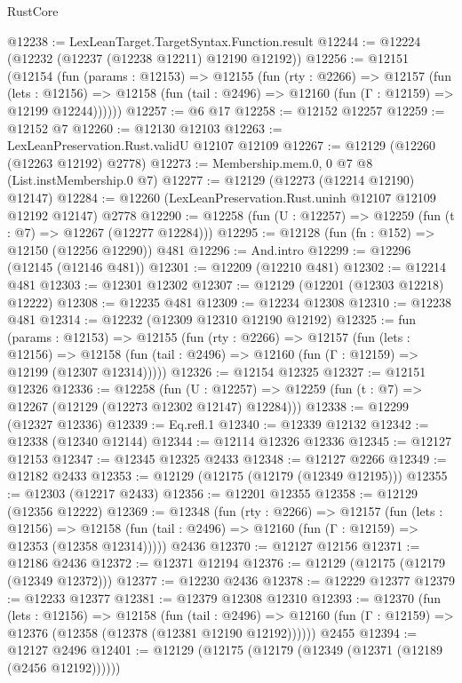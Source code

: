 \begin{lexlean}{RustCore}
\begin{coremodule}
@12238 := LexLeanTarget.TargetSyntax.Function.result
@12244 := @12224 (@12232 (@12237 (@12238 @12211) @12190 @12192))
@12256 := @12151
    (@12154
      (fun (params : @12153) =>
      @12155
        (fun (rty : @2266) =>
        @12157
          (fun (lets : @12156) =>
          @12158 (fun (tail : @2496) => @12160 (fun (Γ : @12159) => @12199 @12244))))))
@12257 := @6 @17
@12258 := @12152 @12257
@12259 := @12152 @7
@12260 := @12130 @12103
@12263 := LexLeanPreservation.Rust.validU @12107 @12109
@12267 := @12129 (@12260 (@12263 @12192) @2778)
@12273 := Membership.mem.{0, 0} @7 @8 (List.instMembership.{0} @7)
@12277 := @12129 (@12273 (@12214 @12190) @12147)
@12284 := @12260 (LexLeanPreservation.Rust.uninh @12107 @12109 @12192 @12147) @2778
@12290 := @12258 (fun (U : @12257) => @12259 (fun (t : @7) => @12267 (@12277 @12284)))
@12295 := @12128 (fun (fn : @152) => @12150 (@12256 @12290)) @481
@12296 := And.intro
@12299 := @12296 (@12145 (@12146 @481))
@12301 := @12209 (@12210 @481)
@12302 := @12214 @481
@12303 := @12301 @12302
@12307 := @12129 (@12201 (@12303 @12218) @12222)
@12308 := @12235 @481
@12309 := @12234 @12308
@12310 := @12238 @481
@12314 := @12232 (@12309 @12310 @12190 @12192)
@12325 := fun (params : @12153) =>
  @12155
    (fun (rty : @2266) =>
    @12157
      (fun (lets : @12156) =>
      @12158 (fun (tail : @2496) => @12160 (fun (Γ : @12159) => @12199 (@12307 @12314)))))
@12326 := @12154 @12325
@12327 := @12151 @12326
@12336 := @12258
    (fun (U : @12257) => @12259 (fun (t : @7) => @12267 (@12129 (@12273 @12302 @12147) @12284)))
@12338 := @12299 (@12327 @12336)
@12339 := Eq.refl.{1}
@12340 := @12339 @12132
@12342 := @12338 (@12340 @12144)
@12344 := @12114 @12326 @12336
@12345 := @12127 @12153
@12347 := @12345 @12325 @2433
@12348 := @12127 @2266
@12349 := @12182 @2433
@12353 := @12129 (@12175 (@12179 (@12349 @12195)))
@12355 := @12303 (@12217 @2433)
@12356 := @12201 @12355
@12358 := @12129 (@12356 @12222)
@12369 := @12348
    (fun (rty : @2266) =>
    @12157
      (fun (lets : @12156) =>
      @12158 (fun (tail : @2496) => @12160 (fun (Γ : @12159) => @12353 (@12358 @12314)))))
    @2436
@12370 := @12127 @12156
@12371 := @12186 @2436
@12372 := @12371 @12194
@12376 := @12129 (@12175 (@12179 (@12349 @12372)))
@12377 := @12230 @2436
@12378 := @12229 @12377
@12379 := @12233 @12377
@12381 := @12379 @12308 @12310
@12393 := @12370
    (fun (lets : @12156) =>
    @12158
      (fun (tail : @2496) =>
      @12160 (fun (Γ : @12159) => @12376 (@12358 (@12378 (@12381 @12190 @12192))))))
    @2455
@12394 := @12127 @2496
@12401 := @12129 (@12175 (@12179 (@12349 (@12371 (@12189 (@2456 @12192))))))

\end{coremodule}
\end{lexlean}
